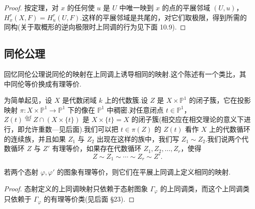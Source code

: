 \begin{proof}
按定理，对 $x$ 的任何使 $u$ 是 $U$ 中唯一映到 $x$ 的点的平展邻域 $(U, u)$，$H^{r}_{x}(X, F) = H^{r}_{u}(U, F)$.这样的平展邻域是共尾的，对它们取极限，得到所需的同构(关于取概形的逆向极限时上同调的行为见下面 10.9).
\end{proof}

\subsection*{同伦公理}

回忆同伦公理说同伦的映射在上同调上诱导相同的映射.这个陈述有一个类比，其中同伦等价换成有理等价.

为简单起见，设 $X$ 是代数闭域 $k$ 上的代数簇.设 $Z$ 是 $X \times \mathbb{P}^{1}$ 的闭子簇，它在投影映射 $\pi \colon X \times \mathbb{P}^{1} \to \mathbb{P}^{1}$ 下的像在 $\mathbb{P}^{1}$ 中稠密.对任意闭点 $t \in \mathbb{P}^{1}$，$Z(t) \overset{\mathrm{def}}{=} Z \cap (X \times \{t\})$ 是 $X \times \{t\} = X$ 的闭子簇(相交应在相交理论的意义下进行，即允许重数---见后面).我们可以把 $t \in \pi(Z)$ 的 $Z(t)$ 看作 $X$ 上的代数循环的连续族，并且如果 $Z_1$ 与 $Z_2$ 出现在这样的族中，我们写 $Z_1 \sim Z_2$.我们说两个代数循环 $Z$ 与 $Z'$ 有理等价，如果存在代数循环 $Z_1, Z_2, \ldots, Z_r$，使得
\[
Z \sim Z_1 \sim \cdots \sim Z_r \sim Z'.
\]

\begin{theorem}\label{thm:9.9}
若两个态射 $\varphi, \varphi'$ 的图象有理等价，则它们在平展上同调上定义相同的映射.
\end{theorem}

\begin{proof}
态射定义的上同调映射只依赖于态射图象 $\Gamma_{\varphi}$ 的上同调类，而这个上同调类只依赖于 $\Gamma_{\varphi}$ 的有理等价类(见后面 \S 23).
\end{proof}
